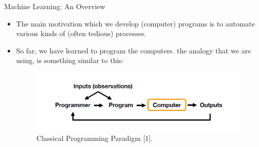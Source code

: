 \documentclass[compress,oilve]{beamer}
\begin{document}


\begin{frame}{Machine Learning: An Overview}
\begin{itemize}
\item The main motivation which we develop (computer) programs is to automate various
kinds of (often tedious) processes.
\item So far, we have learned to program the computers. the analogy that we are using, is something similar to this:\\

\begin{center}
\begin{figure}
\includegraphics[scale=0.5]{1}
\caption{Classical Programming Paradigm [1].}
\end{figure}
\end{center}
\end{itemize}
\end{frame}
\end{document}
